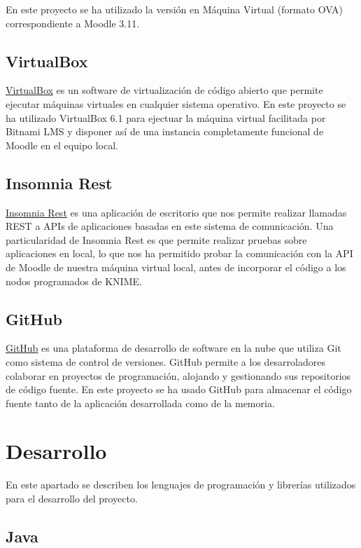 En este proyecto se ha utilizado la versión en Máquina Virtual (formato OVA) correspondiente a Moodle 3.11. 
\

\subsection{VirtualBox}

\href{https://www.virtualbox.org/}{VirtualBox} es un software de virtualización de código abierto que permite ejecutar máquinas 
virtuales en cualquier sistema operativo. En este proyecto se ha utilizado VirtualBox 6.1 para ejectuar la máquina virtual 
facilitada por Bitnami LMS y disponer así de una instancia completamente funcional de Moodle en el equipo local. 


\subsection{Insomnia Rest}

\href{https://insomnia.rest/}{Insomnia Rest} es una aplicación de escritorio que nos permite realizar llamadas REST a APIs de
 aplicaciones basadas en este sistema de comunicación. Una particularidad de Insomnia Rest es que permite realizar 
 pruebas sobre aplicaciones en local, lo que nos ha permitido probar la comunicación con 
 la API de Moodle de nuestra máquina virtual local, antes de incorporar el código a los nodos programados de KNIME.

\subsection{GitHub}

\href{https://github.com/}{GitHub} es una plataforma de desarrollo de software en la nube que utiliza Git como sistema de control 
de versiones. GitHub permite a los desarroladores colaborar en proyectos de programación, alojando y gestionando sus repositorios de 
código fuente. En este proyecto se ha usado GitHub para almacenar el código fuente tanto de la aplicación desarrollada como de la memoria. 

\newpage
\section{Desarrollo}

En este apartado se describen los lenguajes de programación y librerías utilizados para el desarrollo del proyecto. 

\subsection{Java}

